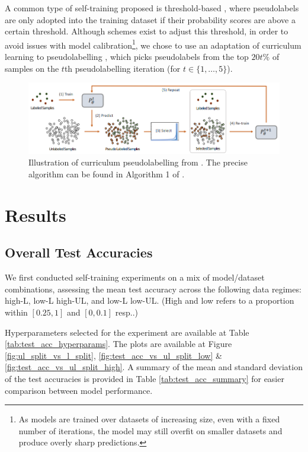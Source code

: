 \documentclass{article}
\begin{document}
A common type of self-training proposed is threshold-based \cite{amini2023selftraining},
where pseudolabels are only adopted into the training dataset if their probability
scores are above a certain threshold.
Although schemes exist to adjust this threshold, in order to avoid issues with model
calibration\footnote{%
  As models are trained over datasets of increasing size, even with a fixed number of
  iterations, the model may still overfit on smaller datasets and produce overly sharp
  predictions.
}, we chose to use an adaptation of curriculum learning to pseudolabelling
\cite{cascante-bonilla2020curriculum}, which picks pseudolabels from the top $20t\%$ of
samples on the $t$th pseudolabelling iteration (for $t \in \{1, \ldots, 5\}$).

\begin{figure}[htbp]
  \centering
  \includegraphics[width=\columnwidth]{curriculum_pseudolabelling.png}
  \caption{
    Illustration of curriculum pseudolabelling from
    \cite{cascante-bonilla2020curriculum}.
    The precise algorithm can be found in Algorithm 1 of
    \cite{cascante-bonilla2020curriculum}.
  }
  \label{fig:curr-pl}
\end{figure}

\section{Results}\label{sec:res}

\subsection{Overall Test Accuracies}

We first conducted self-training experiments on a mix of model/dataset combinations,
assessing the mean test accuracy across the following data regimes: high-L, low-L
high-UL, and low-L low-UL.
(High and low refers to a proportion within $[0.25, 1]$ and $[0, 0.1]$ resp..)

Hyperparameters selected for the experiment are available at Table
\ref{tab:test_acc_hyperparams}.
The plots are available at Figure \ref{fig:ul_split_vs_l_split},
\ref{fig:test_acc_vs_ul_split_low} \& \ref{fig:test_acc_vs_ul_split_high}.
A summary of the mean and standard deviation of the test accuracies is provided in Table
\ref{tab:test_acc_summary} for easier comparison between model performance.
\end{document}
